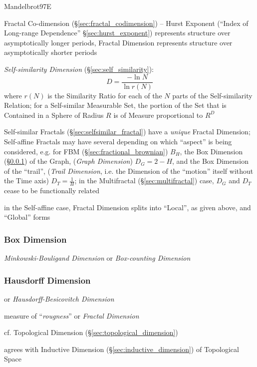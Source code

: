 Mandelbrot97E

Fractal Co-dimension (\S\ref{sec:fractal_codimension}) --
Hurst Exponent (``Index of Long-range Dependence'' \S\ref{sec:hurst_exponent})
represents structure over asymptotically longer periods, Fractal Dimension
represents structure over asymptotically shorter periods

\emph{Self-similarity Dimension} (\S\ref{sec:self_similarity}):
\[
  D = \frac{-\ln N}{\ln r(N)}
\]
where $r(N)$ is the Similarity Ratio for each of the $N$ parts of the
Self-similarity Relation;
for a Self-similar Measurable Set, the portion of the Set that is Contained in a
Sphere of Radius $R$ is of Measure proportional to $R^D$

Self-similar Fractals (\S\ref{sec:selfsimilar_fractal}) have a \emph{unique}
Fractal Dimension; Self-affine Fractals may have several depending on which
``aspect'' is being considered, e.g. for FBM (\S\ref{sec:fractional_brownian})
$B_H$, the Box Dimension (\S\ref{sec:box_dimension}) of the Graph,
(\emph{Graph Dimension}) $D_G = 2 - H$, and the Box Dimension of the ``trail'',
(\emph{Trail Dimension}, i.e. the Dimension of the ``motion'' itself without the
Time axis) $D_T = \frac{1}{H}$; in the Multifractal (\S\ref{sec:multifractal})
case, $D_G$ and $D_T$ cease to be functionally related

in the Self-affine case, Fractal Dimension splits into ``Local'', as given
above, and ``Global'' forms



\subsubsection{Box Dimension}\label{sec:box_dimension}

\emph{Minkowski-Bouligand Dimension} or \emph{Box-counting Dimension}



\subsubsection{Hausdorff Dimension}\label{sec:hausdorff_dimension}

or \emph{Hausdorff-Besicovitch Dimension}

measure of ``\emph{rougness}'' or \emph{Fractal Dimension}

cf. Topological Dimension (\S\ref{sec:topological_dimension})

agrees with Inductive Dimension (\S\ref{sec:inductive_dimension}) of Topological
Space

